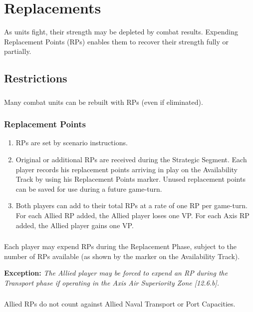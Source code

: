 \section{Replacements}

As units fight, their strength may be depleted by combat results. Expending Replacement Points (RPs) enables them to recover their strength fully or partially.

\subsection{Restrictions}

\subsubsection{} Many combat units can be rebuilt with RPs (even if eliminated).

\subsubsection{\textbf{Replacement Points}}

\begin{enumerate}[label=\alph*.]
    \item RPs are set by scenario instructions.
    \item Original or additional RPs are received during the Strategic Segment. Each player records his replacement points arriving in play on the Availability Track by using his Replacement Points marker. Unused replacement points can be saved for use during a future game-turn.
    \item Both players can add to their total RPs at a rate of one RP per game-turn. For each Allied RP added, the Allied player loses one VP. For each Axis RP added, the Allied player gains one VP.
\end{enumerate}

\subsubsection{} Each player may expend RPs during the Replacement Phase, subject to the number of RPs available (as shown by the marker on the Availability Track).

\textbf{Exception:} \textit{The Allied player may be forced to expend an RP during the Transport phase if operating in the Axis Air Superiority Zone [12.6.b].}

\subsubsection{} Allied RPs do not count against Allied Naval Transport or Port Capacities.


